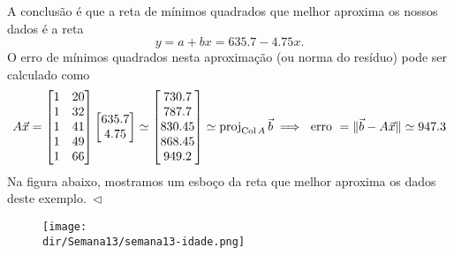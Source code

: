\documentclass[../livro.tex]{subfiles}  %
\providecommand{\dir}{..}
\begin{document}
\begin{example}
  A conclusão é que a reta de mínimos quadrados que melhor aproxima os nossos dados é a reta
  \[
  y = a + b x = 635.7 - 4.75 x.
  \] O erro de mínimos quadrados nesta aproximação (ou norma do resíduo) pode ser calculado como
  \[
  A \vec{x} = \begin{bmatrix}
    1 & 20 \\
    1 & 32 \\
    1 & 41 \\
    1 & 49 \\
    1 & 66 \\
  \end{bmatrix}
  \begin{bmatrix}
    635.7 \\
    4.75 \\
  \end{bmatrix} \simeq
  \begin{bmatrix}
    730.7 \\
    787.7 \\
    830.45 \\
    868.45 \\
    949.2 \\
  \end{bmatrix} \simeq \operatorname{proj}_{\operatorname{Col} A} \vec{b} \implies \text{ erro } = \| \vec{b} - A\vec{x} \| \simeq 947.3
  \] Na figura abaixo, mostramos um esboço da reta que melhor aproxima os dados deste exemplo$. \ \lhd$
  \begin{figure}[h!]
    \begin{center}
      \texttt{[image: \\dir/Semana13/semana13-idade.png]}
    \end{center}
  \end{figure}
\end{example}
\end{document}
